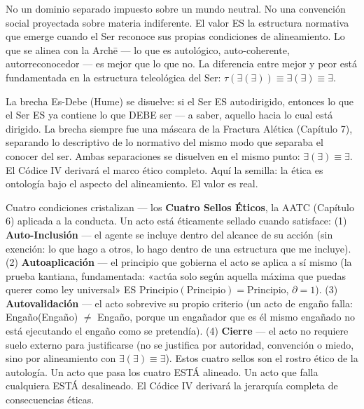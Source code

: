 \documentclass[10pt, openany, oneside]{book}
\begin{document}
No un dominio separado impuesto sobre un mundo neutral. No una convención social proyectada sobre materia indiferente. El valor ES la estructura normativa que emerge cuando el Ser reconoce sus propias condiciones de alineamiento. Lo que se alinea con la Arch\={e} --- lo que es autológico, auto-coherente, autorreconocedor --- es mejor que lo que no. La diferencia entre mejor y peor está fundamentada en la estructura teleológica del Ser: $\tau(\exists(\exists)) \equiv \exists(\exists) \equiv \exists$.

La brecha Es-Debe (Hume) se disuelve: si el Ser ES autodirigido, entonces lo que el Ser ES ya contiene lo que DEBE ser --- a saber, aquello hacia lo cual está dirigido. La brecha siempre fue una máscara de la Fractura Alética (Capítulo 7), separando lo descriptivo de lo normativo del mismo modo que separaba el conocer del ser. Ambas separaciones se disuelven en el mismo punto: $\exists(\exists) \equiv \exists$. El Códice IV derivará el marco ético completo. Aquí la semilla: la ética es ontología bajo el aspecto del alineamiento. El valor es real.

Cuatro condiciones cristalizan --- los \textbf{Cuatro Sellos Éticos}, la AATC (Capítulo 6) aplicada a la conducta. Un acto está éticamente sellado cuando satisface: (1) \textbf{Auto-Inclusión} --- el agente se incluye dentro del alcance de su acción (sin exención: lo que hago a otros, lo hago dentro de una estructura que me incluye). (2) \textbf{Autoaplicación} --- el principio que gobierna el acto se aplica a sí mismo (la prueba kantiana, fundamentada: «actúa solo según aquella máxima que puedas querer como ley universal» ES $\text{Principio}(\text{Principio}) = \text{Principio}$, $\partial = 1$). (3) \textbf{Autovalidación} --- el acto sobrevive su propio criterio (un acto de engaño falla: Engaño(Engaño) $\neq$ Engaño, porque un engañador que es él mismo engañado no está ejecutando el engaño como se pretendía). (4) \textbf{Cierre} --- el acto no requiere suelo externo para justificarse (no se justifica por autoridad, convención o miedo, sino por alineamiento con $\exists(\exists) \equiv \exists$). Estos cuatro sellos son el rostro ético de la autología. Un acto que pasa los cuatro ESTÁ alineado. Un acto que falla cualquiera ESTÁ desalineado. El Códice IV derivará la jerarquía completa de consecuencias éticas.
\end{document}
